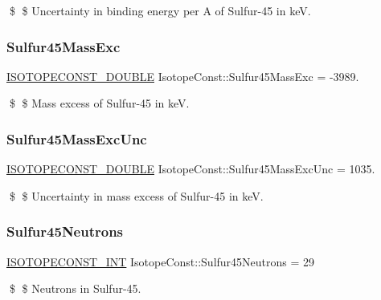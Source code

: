 \$ \$ Uncertainty in binding energy per A of Sulfur-\/45 in keV. \mbox{\label{group___isotope_const-_sulfur-_s45_ga46b6958546c93015281c122d11139247}} 
\subsubsection{\texorpdfstring{Sulfur45\+Mass\+Exc}{Sulfur45MassExc}}
{\footnotesize\ttfamily \mbox{\hyperlink{group___isotope_const-_macros_ga8f45a7272ce02c0b4c65c44636ed719a}{I\+S\+O\+T\+O\+P\+E\+C\+O\+N\+S\+T\+\_\+\+D\+O\+U\+B\+LE}} Isotope\+Const\+::\+Sulfur45\+Mass\+Exc = -\/3989.}

\$ \$ Mass excess of Sulfur-\/45 in keV. \mbox{\label{group___isotope_const-_sulfur-_s45_ga95a711e52e774c9145dafee8cc3d0563}} 
\subsubsection{\texorpdfstring{Sulfur45\+Mass\+Exc\+Unc}{Sulfur45MassExcUnc}}
{\footnotesize\ttfamily \mbox{\hyperlink{group___isotope_const-_macros_ga8f45a7272ce02c0b4c65c44636ed719a}{I\+S\+O\+T\+O\+P\+E\+C\+O\+N\+S\+T\+\_\+\+D\+O\+U\+B\+LE}} Isotope\+Const\+::\+Sulfur45\+Mass\+Exc\+Unc = 1035.}

\$ \$ Uncertainty in mass excess of Sulfur-\/45 in keV. \mbox{\label{group___isotope_const-_sulfur-_s45_ga469c2ee41cc9d452829de36ed8d3a886}} 
\subsubsection{\texorpdfstring{Sulfur45\+Neutrons}{Sulfur45Neutrons}}
{\footnotesize\ttfamily \mbox{\hyperlink{group___isotope_const-_macros_ga5f18360b3e99483a35c32d789e62621c}{I\+S\+O\+T\+O\+P\+E\+C\+O\+N\+S\+T\+\_\+\+I\+NT}} Isotope\+Const\+::\+Sulfur45\+Neutrons = 29}

\$ \$ Neutrons in Sulfur-\/45. \mbox{\label{group___isotope_const-_sulfur-_s45_ga4866bae4ef8e6b996498eed889d0f69c}} 
